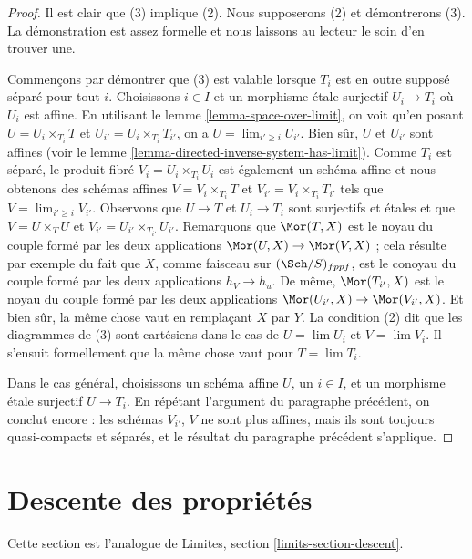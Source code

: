 \begin{proof}
Il est clair que (3) implique (2). Nous supposerons (2) et démontrerons (3).
La démonstration est assez formelle et nous laissons au lecteur le soin
d'en trouver une.

\medskip\noindent
Commençons par démontrer que (3) est valable
lorsque $T_i$ est en outre supposé séparé pour tout $i$.
Choisissons $i \in I$ et un morphisme \'etale surjectif $U_i \to T_i$
où $U_i$ est affine. En utilisant le lemme \ref{lemma-space-over-limit},
on voit qu'en posant $U = U_i \times_{T_i} T$ et
$U_{i'} = U_i \times_{T_i} T_{i'}$, on a $U = \lim_{i' \geq i} U_{i'}$.
Bien sûr, $U$ et $U_{i'}$ sont affines (voir
le lemme \ref{lemma-directed-inverse-system-has-limit}).
Comme $T_i$ est séparé, le produit fibré $V_i = U_i \times_{T_i} U_i$
est également un schéma affine et nous obtenons des schémas affines
$V = V_i \times_{T_i} T$ et
$V_{i'} = V_i \times_{T_i} T_{i'}$ tels que $V = \lim_{i' \geq i} V_{i'}$.
Observons que $U \to T$ et $U_i \to T_i$ sont surjectifs et \'etales
et que $V = U \times_T U$ et $V_{i'} = U_{i'} \times_{T_{i'}} U_{i'}$.
Remarquons que $\Mor(T, X)$ est le noyau du couple formé par les deux applications
$\Mor(U, X) \to \Mor(V, X)$ ; cela résulte par exemple du fait que
$X$, comme faisceau sur $(\Sch/S)_{fppf}$, est le conoyau du couple formé par
les deux applications $h_V \to h_u$. De même,
$\Mor(T_{i'}, X)$ est le noyau du couple formé par les
deux applications $\Mor(U_{i'}, X) \to \Mor(V_{i'}, X)$.
Et bien sûr, la même chose vaut en remplaçant $X$ par $Y$.
La condition (2) dit que les diagrammes de (3) sont cartésiens
dans le cas de $U = \lim U_i$ et $V = \lim V_i$.
Il s'ensuit formellement que la même chose vaut pour $T = \lim T_i$.

\medskip\noindent
Dans le cas général, choisissons un schéma affine $U$, un $i \in I$,
et un morphisme \'etale surjectif $U \to T_i$. En répétant
l'argument du paragraphe précédent, on conclut encore :
les schémas $V_{i'}$, $V$ ne sont plus affines, mais ils sont
toujours quasi-compacts et
séparés, et le résultat du paragraphe précédent s'applique.
\end{proof}




\section{Descente des propriétés}
\label{section-descent}

\noindent
Cette section est l'analogue de Limites, section \ref{limits-section-descent}.

